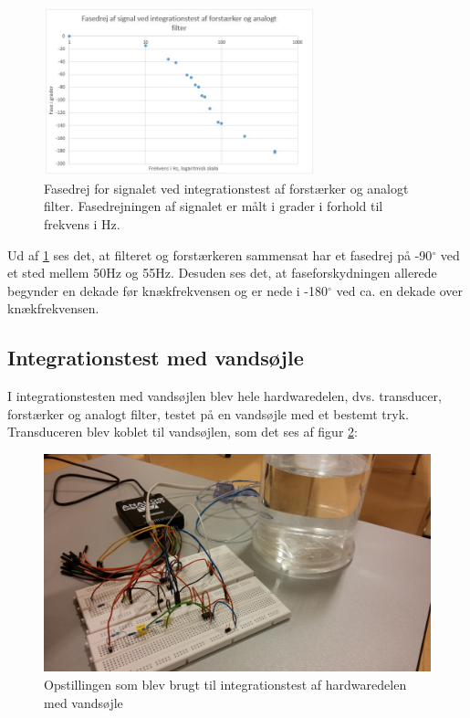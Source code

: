 \begin{figure}[H]
	\centering
	\includegraphics[width=0.7\textwidth]{Figurer/Hardware/FaseForstaerkerFilter}
	\caption{Fasedrej for signalet ved integrationstest af forstærker og analogt filter. Fasedrejningen af signalet er målt i grader i forhold til frekvens i Hz.}
	\label{fig:FaseForstaerkerFilter}
\end{figure}

Ud af \ref{fig:FaseForstaerkerFilter} ses det, at filteret og forstærkeren sammensat har et fasedrej på -90$^{\circ}$ ved et sted mellem 50Hz og 55Hz. Desuden ses det, at faseforskydningen allerede begynder en dekade før knækfrekvensen og er nede i -180$^{\circ}$ ved ca. en dekade over knækfrekvensen.

\subsection{Integrationstest med vandsøjle}
I integrationstesten med vandsøjlen blev hele hardwaredelen, dvs. transducer, forstærker og analogt filter, testet på en vandsøjle med et bestemt tryk. Transduceren blev koblet til vandsøjlen, som det ses af figur \ref{fig:IntegrationVandsoejle}: 

\begin{figure}[H]
	\centering
	\includegraphics[width=1\textwidth]{Figurer/Hardware/IntegrationVandsoejle}
	\caption{Opstillingen som blev brugt til integrationstest af hardwaredelen med vandsøjle}
	\label{fig:IntegrationVandsoejle}
\end{figure}

